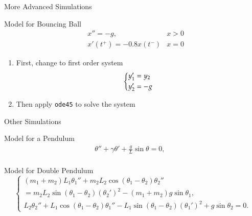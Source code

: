 \documentclass[10pt]{beamer}
\begin{document}
\begin{frame}{More Advanced Simulations}

{
}

\begin{block}{Model for Bouncing Ball}
\begin{align*}
&x''=-g, & x>0\\
&x'(t^+)=-0.8 x(t^-) & x=0
\end{align*}
\end{block}

\begin{enumerate}
    \item First, change to first order system
        $$
        \begin{dcases}
            y_1' = y_2\\
            y_2' = -g
        \end{dcases}
        $$
    \item Then apply \texttt{ode45} to solve the system
\end{enumerate}
\end{frame}


\begin{frame}{Other Simulations}

\begin{block}{Model for a Pendulum}
\begin{align*}
\theta''+\gamma \theta' +\frac{g}{L}\sin \theta=0, &\\
\end{align*}
\end{block}

\begin{block}{Model for Double Pendulum}
\[
\begin{cases}
(m_1+m_2)L_1\theta_1''
+m_2L_2\cos(\theta_1-\theta_2)\theta_2''\\
=m_2L_2\sin(\theta_1-\theta_2)(\theta_2')^2
-(m_1+m_2)g\sin\theta_1,\\[3mm]
L_2\theta_2''
+L_1\cos(\theta_1-\theta_2)\theta_1''
-L_1\sin(\theta_1-\theta_2)(\theta_1')^2
+g\sin\theta_2=0.
\end{cases}
\]
\end{block}

\end{frame}


\end{document}
